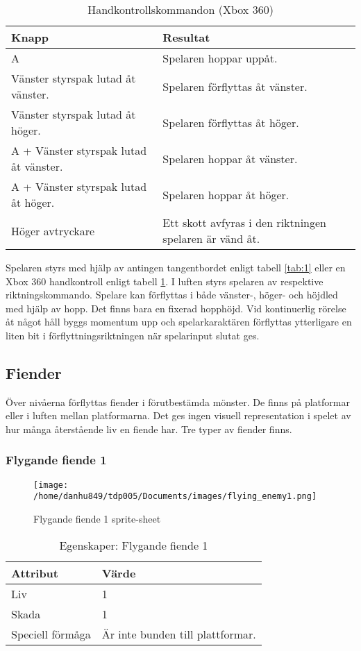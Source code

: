 \documentclass{TDP005mall}
\begin{document}
\begin{table}[h!]
  \caption{Handkontrollskommandon (Xbox 360)\label{tab:2}}
\begin{tabular}{|l|l|}
\hline
Knapp & Resultat \\\hline
A & Spelaren hoppar uppåt. \\\hline
Vänster styrspak lutad åt vänster.  & Spelaren förflyttas åt vänster. \\\hline
Vänster styrspak lutad åt höger. & Spelaren förflyttas åt höger. \\\hline
A + Vänster styrspak lutad åt vänster. & Spelaren hoppar åt vänster. \\\hline
A + Vänster styrspak lutad åt höger. & Spelaren hoppar åt höger. \\\hline
Höger avtryckare & Ett skott avfyras i den riktningen spelaren är vänd åt. \\\hline
\end{tabular}
\end{table}

Spelaren styrs med hjälp av antingen tangentbordet enligt tabell \ref{tab:1} eller en Xbox 360 handkontroll enligt tabell \ref{tab:2}. I luften styrs spelaren av respektive riktningskommando. Spelare kan förflyttas i både vänster-, höger- och höjdled med hjälp av hopp. Det finns bara en fixerad hopphöjd. Vid kontinuerlig rörelse åt något håll byggs momentum upp och spelarkaraktären förflyttas ytterligare en liten bit i förflyttningsriktningen när spelarinput slutat ges.

\subsection{Fiender}
Över nivåerna förflyttas fiender i förutbestämda mönster. De finns på platformar eller i luften mellan platformarna. Det ges ingen visuell representation i spelet av hur många återstående liv en fiende har. Tre typer av fiender finns.

\subsubsection*{Flygande fiende 1}
\begin{figure}[h!]
  \caption{Flygande fiende 1 sprite-sheet\label{fig:1}}
  \texttt{[image: /home/danhu849/tdp005/Documents/images/flying\_enemy1.png]}
\end{figure}

\begin{table}[h!]
  \caption{Egenskaper: Flygande fiende 1\label{tab:3}}
\begin{tabular}{|l|l|}
\hline
Attribut & Värde \\\hline
Liv & 1 \\\hline
Skada & 1 \\\hline
Speciell förmåga & Är inte bunden till plattformar. \\\hline
\end{tabular}
\end{table}
\end{document}
